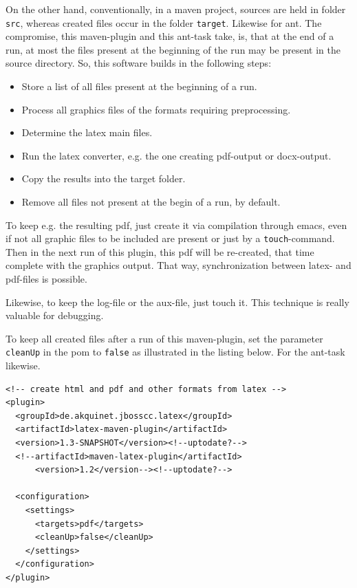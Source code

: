 \documentclass[12pt]{article}
\begin{document}
On the other hand, 
conventionally, in a maven project, 
sources are held in folder {\tt src}, 
whereas created files occur in the folder {\tt target}. 
Likewise for ant. 
The compromise, this maven-plugin and this ant-task take, 
is, that at the end of a run, 
at most the files present at the beginning of the run 
may be present in the source directory. 
So, this software builds in the following steps: 
%
\begin{itemize}
\item
Store a list of all files present at the beginning of a run.
\item
Process all graphics files of the formats requiring preprocessing.
\item
Determine the latex main files.
\item
Run the latex converter, e.g. the one creating pdf-output or docx-output.
\item
Copy the results into the target folder.
\item
Remove all files not present at the begin of a run, by default. 
\end{itemize}

To keep e.g. the resulting pdf, 
just create it via compilation through emacs, 
even if not all graphic files to be included are present 
or just by a {\tt touch}-command. 
Then in the next run of this plugin, 
this pdf will be re-created, 
that time complete with the graphics output. 
That way, synchronization between latex- and pdf-files is possible. 

Likewise, to keep the log-file or the aux-file, just touch it. 
This technique is really valuable for debugging. 

To keep all created files after a run of this maven-plugin, 
set the parameter {\tt cleanUp} in the pom 
to {\tt false} as illustrated in the listing below. 
For the ant-task likewise. 
%
\lstset{language=xml, basicstyle=\small}
\begin{lstlisting}
<!-- create html and pdf and other formats from latex -->
<plugin>
  <groupId>de.akquinet.jbosscc.latex</groupId>
  <artifactId>latex-maven-plugin</artifactId>
  <version>1.3-SNAPSHOT</version><!--uptodate?-->
  <!--artifactId>maven-latex-plugin</artifactId>
      <version>1.2</version--><!--uptodate?-->
	
  <configuration>
    <settings>
      <targets>pdf</targets>
      <cleanUp>false</cleanUp>
    </settings>
  </configuration>
</plugin>
\end{lstlisting}
\end{document}
